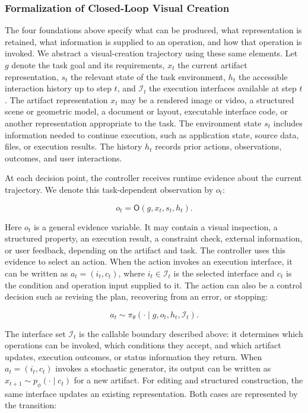 \subsubsection{Formalization of Closed-Loop Visual Creation}

The four foundations above specify what can be produced, what representation is retained, what information is supplied to an operation, and how that operation is invoked. We abstract a visual-creation trajectory using these same elements. Let $g$ denote the task goal and its requirements, $x_t$ the current artifact representation, $s_t$ the relevant state of the task environment, $h_t$ the accessible interaction history up to step $t$, and $\mathcal{I}_t$ the execution interfaces available at step $t$. The artifact representation $x_t$ may be a rendered image or video, a structured scene or geometric model, a document or layout, executable interface code, or another representation appropriate to the task. The environment state $s_t$ includes information needed to continue execution, such as application state, source data, files, or execution results. The history $h_t$ records prior actions, observations, outcomes, and user interactions.

At each decision point, the controller receives runtime evidence about the current trajectory. We denote this task-dependent observation by $o_t$:

\begin{equation}
  o_t = \mathsf{O}(g,x_t,s_t,h_t).
\end{equation}

Here $o_t$ is a general evidence variable. It may contain a visual inspection, a structured property, an execution result, a constraint check, external information, or user feedback, depending on the artifact and task. The controller uses this evidence to select an action. When the action invokes an execution interface, it can be written as $a_t=(i_t,c_t)$, where $i_t\in\mathcal{I}_t$ is the selected interface and $c_t$ is the condition and operation input supplied to it. The action can also be a control decision such as revising the plan, recovering from an error, or stopping:

\begin{equation}
  a_t \sim \pi_{\theta}\!\left(\cdot \mid g,o_t,h_t,\mathcal{I}_t\right).
\end{equation}

The interface set $\mathcal{I}_t$ is the callable boundary described above: it determines which operations can be invoked, which conditions they accept, and which artifact updates, execution outcomes, or status information they return. When $a_t=(i_t,c_t)$ invokes a stochastic generator, its output can be written as $x_{t+1}\sim p_{\phi}(\cdot\mid c_t)$ for a new artifact. For editing and structured construction, the same interface updates an existing representation. Both cases are represented by the transition:

